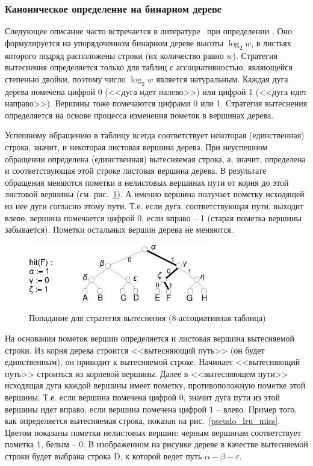 \subsubsection{Каноническое определение \PseudoLRU на бинарном дереве}

Следующее описание часто встречается в литературе~\cite{FundamentalOfComputerOrganizationAndDesign} при
определении \PseudoLRU. Оно формулируется на упорядоченном бинарном дереве высоты $\log_2 w$, в листьях которого подряд расположены строки (их количество равно $w$). Стратегия вытеснения
\PseudoLRU определяется только для таблиц с ассоциативностью, являющейся степенью двойки, поэтому число $\log_2 w$ является натуральным. Каждая дуга дерева помечена цифрой 0 (<<дуга идет налево>>) или цифрой 1 (<<дуга идет направо>>). Вершины тоже помечаются цифрами 0 или 1. Стратегия вытеснения определяется на основе процесса изменения пометок в вершинах дерева.

Успешному обращению в таблицу всегда соответствует некоторая (единственная) строка, значит, и некоторая листовая вершина дерева. При неуспешном обращении определена (единственная) вытесняемая строка, а, значит, определена и соответствующая этой строке листовая вершина дерева. В результате обращения меняются пометки в нелистовых вершинах пути от корня до этой листовой вершины (см. рис.~\ref{pseudo_lru_hit}). А именно вершина получает пометку
исходящей из нее дуги согласно этому пути. Т.е. если дуга, соответствующая пути, выходит влево, вершина помечается цифрой 0, если вправо -- 1 (старая пометка вершины забывается). Пометки остальных вершин дерева не меняются.

\begin{figure}[h] \center
  \includegraphics[width=0.7\textwidth]{2.theor/plruhit}\\
  \caption{Попадание для стратегия вытеснения \PseudoLRU
  (8-ассоциативная таблица)}\label{pseudo_lru_hit}
\end{figure}

На основании пометок вершин определяется и листовая вершина вытесняемой строки.
Из корня дерева строится <<вытесняющий путь>> (он будет единственным), он приводит к вытесняемой строке. Начинает <<вытесняющий путь>> строиться из корневой вершины. Далее в <<вытесняющем пути>> исходящая дуга каждой вершины имеет пометку, противоположную пометке этой вершины. Т.е. если вершина помечена цифрой 0, значит дуга пути из этой вершины идет вправо, если вершина помечена цифрой 1 -- влево. Пример того, как определяется вытесняемая строка, показан на рис.~\ref{pseudo_lru_miss}. Цветом показаны пометки нелистовых вершин: черным
вершинам соответствует пометка 1, белым -- 0. В изображенном на рисунке дереве в качестве вытесняемой строки будет выбрана строка D, к которой ведет путь $\alpha-\beta-\varepsilon$.


